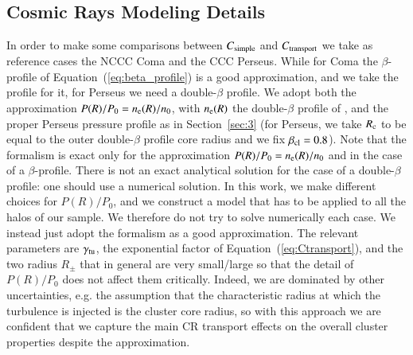 \documentclass[traditabstract]{aa}
\begin{document}
\begin{appendix}
\section{Cosmic Rays Modeling Details}
\label{app:B}

In order to make some comparisons between $C_{\rm{simple}}$ and $C_{\rm{transport}}$ we take as reference cases the NCCC Coma and the CCC Perseus. While for Coma the $\beta$-profile of Equation~(\ref{eq:beta_profile}) is a good approximation, and we take the \cite{1992A&A...259L..31B} profile for it, for Perseus we need a double-$\beta$ profile. We adopt both the approximation $P(R)/P_{0}=n_{\rm{e}}(R)/n_{0}$, with $n_{\rm{e}}(R)$ the double-$\beta$ profile of \cite{2003ApJ...590..225C}, and the proper Perseus pressure profile as in Section~\ref{sec:3} (for Perseus, we take $R_{\rm{c}}$ to be equal to the outer double-$\beta$ profile core radius and we fix $\beta_{\rm{cl}}=0.8$). Note that the \cite{2011A&A...527A..99E} formalism is exact only for the approximation $P(R)/P_{0}=n_{\rm{e}}(R)/n_{0}$ and in the case of a $\beta$-profile. There is not an exact analytical solution for the case of a double-$\beta$ profile: one should use a numerical solution. In this work, we make different choices for $P(R)/P_{0}$, and we construct a model that has to be applied to all the halos of our sample. We therefore do not try to solve numerically each case. We instead just adopt the \cite{2011A&A...527A..99E} formalism as a good approximation. The relevant parameters are $\gamma_{\rm{tu}}$, the exponential factor of Equation~(\ref{eq:Ctransport}), and the two radius $R_{\pm}$ that in general are very small/large so that the detail of $P(R)/P_{0}$ does not affect them critically. Indeed, we are dominated by other uncertainties, e.g. the assumption that the characteristic radius at which the turbulence is injected is the cluster core radius, so with this approach we are confident that we capture the main CR transport effects on the overall cluster properties despite the approximation.


\end{appendix}
\end{document}
